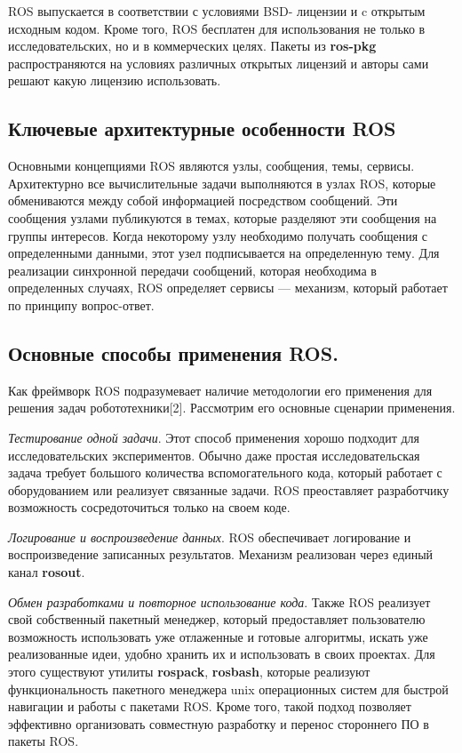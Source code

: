 \documentclass[10pt, a5paper]{article}
\begin{document}
ROS выпускается в соответствии с условиями BSD- лицензии и c открытым исходным кодом. Кроме того, ROS бесплатен для использования не только в исследовательских, но и в коммерческих целях. Пакеты из \textbf{ros-pkg} распространяются на условиях различных открытых лицензий и авторы сами решают какую лицензию использовать.

\subsection*{Ключевые архитектурные особенности ROS}

Основными концепциями ROS являются узлы, сообщения, темы, сервисы. Архитектурно все вычислительные задачи выполняются в узлах ROS, которые обмениваются между собой информацией посредством сообщений. Эти сообщения узлами публикуются в темах, которые разделяют эти сообщения на группы интересов. Когда некоторому узлу необходимо получать сообщения с определенными данными, этот узел подписывается на определенную тему. Для реализации синхронной передачи сообщений, которая необходима в определенных случаях, ROS определяет сервисы — механизм, который работает по принципу вопрос-ответ.

\subsection*{Основные способы применения ROS.}

Как фреймворк ROS подразумевает наличие методологии его применения для решения задач робототехники[2]. Рассмотрим его основные сценарии применения.

\emph{Тестирование одной задачи}. Этот способ применения хорошо подходит для исследовательских экспериментов. Обычно даже простая исследовательская задача требует большого количества вспомогательного кода, который работает с оборудованием или реализует связанные задачи. ROS преоставляет разработчику возможность сосредоточиться только на своем коде.

\emph{Логирование и воспроизведение данных}. ROS обеспечивает логирование и воспроизведение записанных результатов. Механизм реализован через единый канал \textbf{rosout}.

\emph{Обмен разработками и повторное использование кода}. Также ROS реализует свой собственный пакетный менеджер, который предоставляет пользователю возможность использовать уже отлаженные и готовые алгоритмы, искать уже реализованные идеи, удобно хранить их и использовать в своих проектах. Для этого существуют утилиты \textbf{rospack}, \textbf{rosbash}, которые реализуют функциональность пакетного менеджера unix операционных систем для быстрой навигации и работы с пакетами ROS. Кроме того, такой подход позволяет эффективно организовать совместную разработку и перенос стороннего ПО в пакеты ROS.
\end{document}
